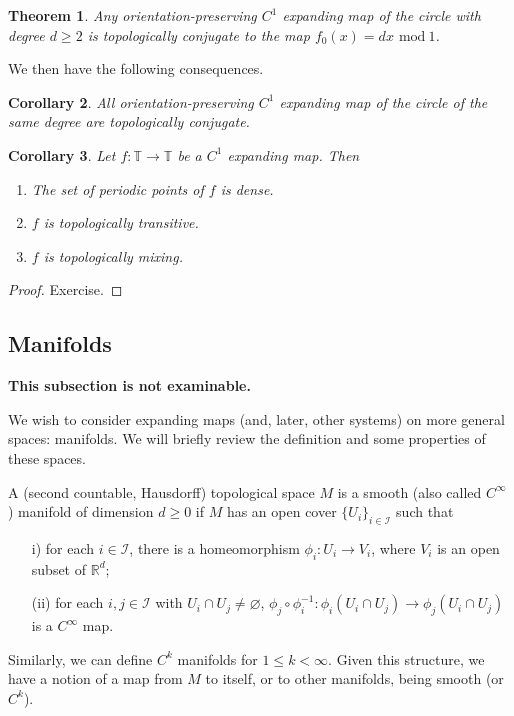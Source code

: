 \documentclass[12pt]{article}
\newtheorem{theorem}{Theorem}[section]
\newtheorem{corollary}[theorem]{Corollary}
\theoremstyle{definition}
\theoremstyle{remark}
\begin{document}
\begin{theorem}
Any orientation-preserving $C^1$ expanding map of the circle with degree $d \ge 2$ is topologically conjugate to the map $f_0(x)=dx$ $\mathrm{mod} \ 1$.
\end{theorem}

We then have the following consequences.

\begin{corollary}
All orientation-preserving $C^1$ expanding map of the circle of the same degree are
topologically conjugate.
\end{corollary}

\begin{corollary}
Let $f : \mathbb T \to \mathbb T$ be a $C^1$ expanding map. Then
\begin{enumerate}
\item The set of periodic points of $f$ is dense.
\item $f$ is topologically transitive.
\item $f$ is topologically mixing.
\end{enumerate}
\end{corollary}

\begin{proof} Exercise.
\end{proof}


\subsection{Manifolds}

\noindent
{\bf This subsection is not examinable.}

We wish to consider expanding maps (and, later, other systems) on more general spaces: manifolds.
We will briefly review the definition and some properties of these spaces.

A (second countable, Hausdorff) topological space $M$ is a smooth (also called $C^\infty$)
manifold of dimension $d \ge 0$ if $M$ has an open cover $\{U_i\}_{i \in \mathcal I}$
such that
\begin{enumerate}
\item[i)]
for each $i \in \mathcal I$, there is a homeomorphism $\phi_i : U_i \to V_i$, where
$V_i$ is an open subset of $\mathbb R^d$;
\item[(ii)]
for each $i,j \in \mathcal I$ with $U_i \cap U_j \ne \varnothing$, $\phi_j \circ \phi_i^{-1}
: \phi_i(U_i \cap U_j) \to \phi_j(U_i \cap U_j)$ is a $C^\infty$ map.
\end{enumerate}
Similarly, we can define $C^k$ manifolds for $1 \le k <\infty$.
Given this structure, we have a notion of a map from $M$ to itself, or to other manifolds,
being smooth (or $C^k$).
\end{document}
